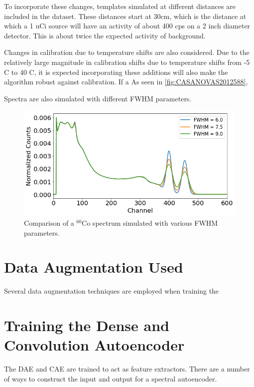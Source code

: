 To incorporate these changes, templates simulated at different distances are included in the dataset. These distances start at 30cm, which is the distance at which a 1 uCi source will have an activity of about 400 cps on a 2 inch diameter detector. This is about twice the expected activity of background. 

Changes in calibration due to temperature shifts are also considered. Due to the relatively large magnitude in calibration shifts due to temperature shifts from -5 C to 40 C, it is expected incorporating these additions will also make the algorithm robust against calibration. If a As seen in \ref{fig:CASANOVAS2012588}, 


Spectra are also simulated with different FWHM parameters.


\begin{figure}[H]
\centering
\includegraphics[width=0.95\linewidth]{images/sim_spectra_FWHM_comparison}
\caption{Comparison of a $^{60}$Co spectrum simulated with various FWHM parameters.}
\label{fig:sim_spectra_FWHM_comparison}
\end{figure}


\section{Data Augmentation Used}

Several data augmentation techniques are employed when training the 



\section{Training the Dense and Convolution Autoencoder}

The DAE and CAE are trained to act as feature extractors. There are a number of ways to construct the input and output for a spectral autoencoder. 






